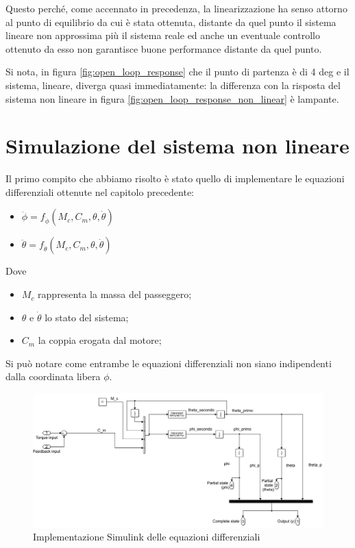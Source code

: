 Questo perché, come accennato in precedenza, la linearizzazione ha senso attorno al punto di equilibrio da cui è stata ottenuta, distante da quel punto il sistema lineare non approssima più il sistema reale ed anche un eventuale controllo ottenuto da esso non garantisce buone performance distante da quel punto. 

Si nota, in figura \ref{fig:open_loop_response} che il punto di partenza è di 4 deg e il sistema, lineare, diverga quasi immediatamente: la differenza con la risposta del sistema non lineare in figura \ref{fig:open_loop_response_non_linear} è lampante.


\section{Simulazione del sistema non lineare}

Il primo compito che abbiamo risolto è stato quello di implementare le equazioni differenziali ottenute nel capitolo precedente:
\begin{itemize}
	\item $\ddot{\phi} = f_{\ddot{\phi}} (M_c, C_m, \theta,\dot{\theta})$
	\item $\ddot{\theta} = f_{\ddot{\theta}} (M_c, C_m, \theta,\dot{\theta})$
\end{itemize}

Dove 
\begin{itemize}
	\item $M_c$ rappresenta la massa del passeggero;
	\item $\theta$ e $\dot{\theta}$ lo stato del sistema;
	\item $C_m$  la coppia erogata dal motore;
\end{itemize}

Si può notare come entrambe le equazioni differenziali non siano indipendenti dalla coordinata libera $\phi$.
\begin{figure}[H]
	\centering   	
	\includegraphics[width=1\textwidth]{Immagini/non_linear_system.png}
	\caption{Implementazione Simulink delle equazioni differenziali}
	\label{fig:non_linear_system}
\end{figure}

